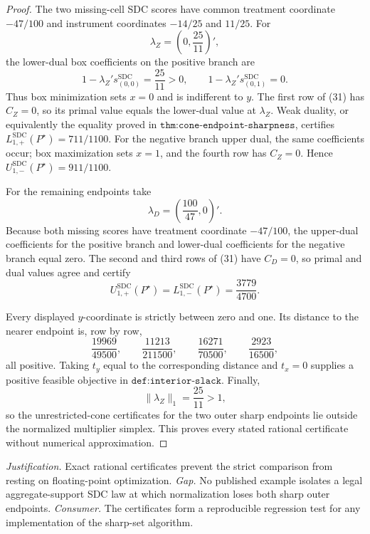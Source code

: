 \documentclass{article}
\begin{document}
\begin{proof}
The two missing-cell SDC scores have common treatment coordinate \(-47/100\) and instrument coordinates \(-14/25\) and \(11/25\).  For
\[
 \lambda_Z=\left(0,\frac{25}{11}\right)',
\]
the lower-dual box coefficients on the positive branch are
\[
 1-\lambda_Z's_{(0,0)}^{\mathrm{SDC}}=\frac{25}{11}>0,
 \qquad
 1-\lambda_Z's_{(0,1)}^{\mathrm{SDC}}=0.                                     \tag{32}
\]
Thus box minimization sets \(x=0\) and is indifferent to \(y\).  The first row of (31) has \(C_Z=0\), so its primal value equals the lower-dual value at \(\lambda_Z\).  Weak duality, or equivalently the equality proved in \(\texttt{thm:cone-endpoint-sharpness}\), certifies
\(L_{1,+}^{\mathrm{SDC}}(P^\star)=711/1100\).  For the negative branch upper dual, the same coefficients occur; box maximization sets \(x=1\), and the fourth row has \(C_Z=0\).  Hence \(U_{1,-}^{\mathrm{SDC}}(P^\star)=911/1100\).

For the remaining endpoints take
\[
 \lambda_D=\left(\frac{100}{47},0\right)'.
\]
Because both missing scores have treatment coordinate \(-47/100\), the upper-dual coefficients for the positive branch and lower-dual coefficients for the negative branch equal zero.  The second and third rows of (31) have \(C_D=0\), so primal and dual values agree and certify
\[
 U_{1,+}^{\mathrm{SDC}}(P^\star)
 =L_{1,-}^{\mathrm{SDC}}(P^\star)
 =\frac{3779}{4700}.                                                          \tag{33}
\]

Every displayed \(y\)-coordinate is strictly between zero and one.  Its distance to the nearer endpoint is, row by row,
\[
 \frac{19969}{49500},\qquad
 \frac{11213}{211500},\qquad
 \frac{16271}{70500},\qquad
 \frac{2923}{16500},                                                         \tag{34}
\]
all positive.  Taking \(t_y\) equal to the corresponding distance and \(t_x=0\) supplies a positive feasible objective in \(\texttt{def:interior-slack}\).  Finally,
\[
 \|\lambda_Z\|_1=\frac{25}{11}>1,
\]
so the unrestricted-cone certificates for the two outer sharp endpoints lie outside the normalized multiplier simplex.  This proves every stated rational certificate without numerical approximation.
\end{proof}
\par\smallskip\noindent \textit{Justification.} Exact rational certificates prevent the strict comparison from resting on floating-point optimization. \textit{Gap.} No published example isolates a legal aggregate-support SDC law at which normalization loses both sharp outer endpoints. \textit{Consumer.} The certificates form a reproducible regression test for any implementation of the sharp-set algorithm.
\end{document}

